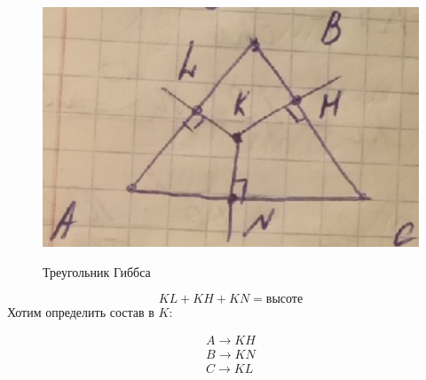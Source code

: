 \begin{lecture}
	\begin{lecSection}
		\begin{figure}
			\centering\includegraphics[width=\linewidth]{lecture_08/triangle_gibbs}
			\label{fig:triangle_gibbs}
			\caption{Треугольник Гиббса}
		\end{figure}
		\begin{equation*}
			KL + KH + KN = \text{высоте}
		\end{equation*}
		Хотим определить состав в $ K $:
		\begin{center}\noindent\begin{gather*}
		A \rightarrow KH \\
		B \rightarrow KN \\
		C \rightarrow KL
		\end{gather*}\end{center}
	\end{lecSection}


\end{lecture}
